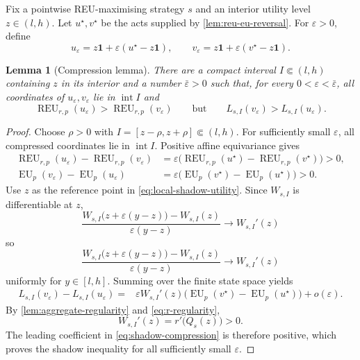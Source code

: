 \documentclass[11pt,a4paper]{article}
\newtheorem{lemma}[lemma]{Lemma}
\theoremstyle{definition}
\newcommand{\REU}{\operatorname{REU}}
\newcommand{\EU}{\operatorname{EU}}
\newcommand{\one}{\mathbf 1}
\begin{document}
Fix a pointwise REU-maximising strategy $s$ and an interior utility level
$z\in(l,h)$. Let $u^\star,v^\star$ be the acts supplied by
\cref{lem:reu-eu-reversal}. For $\varepsilon>0$, define
\begin{equation}\label{eq:compressed-acts}
 u_\varepsilon=z\one+\varepsilon(u^\star-z\one),
 \qquad
 v_\varepsilon=z\one+\varepsilon(v^\star-z\one).
\end{equation}

\begin{lemma}[Compression lemma]\label{lem:compression}
There are a compact interval $I\Subset(l,h)$ containing $z$ in its interior
and a number $\bar\varepsilon>0$ such that, for every
$0<\varepsilon<\bar\varepsilon$, all coordinates of
$u_\varepsilon,v_\varepsilon$ lie in $\operatorname{int} I$ and
\begin{equation}\label{eq:compressed-reversal}
 \REU_{r,p}(u_\varepsilon)>\REU_{r,p}(v_\varepsilon)
 \qquad\text{but}\qquad
 L_{s,I}(v_\varepsilon)>L_{s,I}(u_\varepsilon).
\end{equation}
\end{lemma}

\begin{proof}
Choose $\rho>0$ with $I=[z-\rho,z+\rho]\Subset(l,h)$. For sufficiently small
$\varepsilon$, all compressed coordinates lie in $\operatorname{int} I$.
Positive affine equivariance gives
\begin{align*}
 \REU_{r,p}(u_\varepsilon)-\REU_{r,p}(v_\varepsilon)
 &=\varepsilon
   \bigl(\REU_{r,p}(u^\star)-\REU_{r,p}(v^\star)\bigr)>0,\\
 \EU_p(v_\varepsilon)-\EU_p(u_\varepsilon)
 &=\varepsilon
   \bigl(\EU_p(v^\star)-\EU_p(u^\star)\bigr)>0.
\end{align*}
Use $z$ as the reference point in \eqref{eq:local-shadow-utility}. Since
$W_{s,I}$ is differentiable at $z$,
\[
 \frac{W_{s,I}\bigl(z+\varepsilon(y-z)\bigr)-
 W_{s,I}(z)}{\varepsilon(y-z)}\longrightarrow W_{s,I}'(z)
\]
so 
\[
 \frac{W_{s,I}\bigl(z+\varepsilon(y-z)\bigr)-
 W_{s,I}(z)}{\varepsilon(y-z)}\longrightarrow W_{s,I}'(z)
\]
uniformly for $y\in[l,h]$. Summing over the finite state space yields
\begin{align}
 L_{s,I}(v_\varepsilon)-L_{s,I}(u_\varepsilon)
 ={}&\varepsilon W_{s,I}'(z)
 \bigl(\EU_p(v^\star)-\EU_p(u^\star)\bigr)+o(\varepsilon).
 \label{eq:shadow-compression}
\end{align}
By \cref{lem:aggregate-regularity} and \eqref{eq:r-regularity},
\[
 W_{s,I}'(z)=r'\bigl(Q_s(z)\bigr)>0.
\]
The leading coefficient in \eqref{eq:shadow-compression} is therefore
positive, which proves the shadow inequality for all sufficiently small
$\varepsilon$.
\end{proof}
\end{document}
